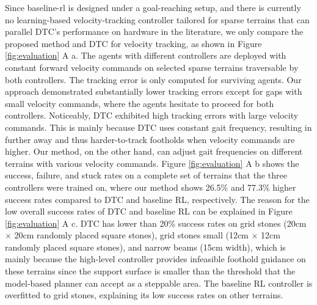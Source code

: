 \documentclass[9pt,twocolumn,twoside]{osajnl}
\begin{document}
Since baseline-rl is designed under a goal-reaching setup, and there is currently no learning-based velocity-tracking controller tailored for sparse terrains that can parallel DTC's performance on hardware in the literature, we only compare the proposed method and DTC for velocity tracking, as shown in Figure \ref{fig:evaluation} A a. The agents with different controllers are deployed with constant forward velocity commands on selected sparse terrains traversable by both controllers. The tracking error is only computed for surviving agents. Our approach demonstrated substantially lower tracking errors except for gaps with small velocity commands, where the agents hesitate to proceed for both controllers. Noticeably, DTC exhibited high tracking errors with large velocity commands. This is mainly because DTC uses constant gait frequency, resulting in further away and thus harder-to-track footholds when velocity commands are higher. Our method, on the other hand, can adjust gait frequencies on different terrains with various velocity commands. Figure \ref{fig:evaluation} A b shows the success, failure, and stuck rates on a complete set of terrains that the three controllers were trained on, where our method shows 26.5\% and 77.3\% higher success rates compared to DTC and baseline RL, respectively. The reason for the low overall success rates of DTC and baseline RL can be explained in Figure \ref{fig:evaluation} A c. DTC has lower than 20\% success rates on grid stones (20cm $\times$ 20cm randomly placed square stones), grid stones small (12cm $\times$ 12cm randomly placed square stones), and narrow beams (15cm width), which is mainly because the high-level controller provides infeasible foothold guidance on these terrains since the support surface is smaller than the threshold that the model-based planner can accept as a steppable area. The baseline RL controller is overfitted to grid stones, explaining its low success rates on other terrains.
\end{document}
